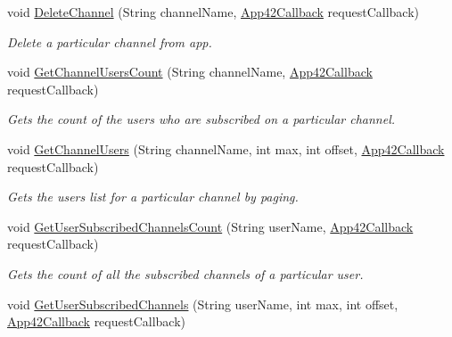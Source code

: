 \begin{DoxyCompactItemize}
void \hyperlink{classcom_1_1shephertz_1_1app42_1_1paas_1_1sdk_1_1windows_1_1push_1_1_push_notification_service_a9b16ea7ff971e6124628552f9e669d44}{Delete\+Channel} (String channel\+Name, \hyperlink{interfacecom_1_1shephertz_1_1app42_1_1paas_1_1sdk_1_1windows_1_1_app42_callback}{App42\+Callback} request\+Callback)
\begin{DoxyCompactList}\small\item\em Delete a particular channel from app. \end{DoxyCompactList}\item 
void \hyperlink{classcom_1_1shephertz_1_1app42_1_1paas_1_1sdk_1_1windows_1_1push_1_1_push_notification_service_a6ecfea7a92869ceef44011fc6bf1a0b9}{Get\+Channel\+Users\+Count} (String channel\+Name, \hyperlink{interfacecom_1_1shephertz_1_1app42_1_1paas_1_1sdk_1_1windows_1_1_app42_callback}{App42\+Callback} request\+Callback)
\begin{DoxyCompactList}\small\item\em Gets the count of the users who are subscribed on a particular channel. \end{DoxyCompactList}\item 
void \hyperlink{classcom_1_1shephertz_1_1app42_1_1paas_1_1sdk_1_1windows_1_1push_1_1_push_notification_service_a5919bb48683c173a8bf8f4ea59bda6e3}{Get\+Channel\+Users} (String channel\+Name, int max, int offset, \hyperlink{interfacecom_1_1shephertz_1_1app42_1_1paas_1_1sdk_1_1windows_1_1_app42_callback}{App42\+Callback} request\+Callback)
\begin{DoxyCompactList}\small\item\em Gets the users list for a particular channel by paging. \end{DoxyCompactList}\item 
void \hyperlink{classcom_1_1shephertz_1_1app42_1_1paas_1_1sdk_1_1windows_1_1push_1_1_push_notification_service_a169a6819d9915225933b2a9493ec19a2}{Get\+User\+Subscribed\+Channels\+Count} (String user\+Name, \hyperlink{interfacecom_1_1shephertz_1_1app42_1_1paas_1_1sdk_1_1windows_1_1_app42_callback}{App42\+Callback} request\+Callback)
\begin{DoxyCompactList}\small\item\em Gets the count of all the subscribed channels of a particular user. \end{DoxyCompactList}\item 
void \hyperlink{classcom_1_1shephertz_1_1app42_1_1paas_1_1sdk_1_1windows_1_1push_1_1_push_notification_service_a4ec490e9504bc65276183f99b6e9ecf3}{Get\+User\+Subscribed\+Channels} (String user\+Name, int max, int offset, \hyperlink{interfacecom_1_1shephertz_1_1app42_1_1paas_1_1sdk_1_1windows_1_1_app42_callback}{App42\+Callback} request\+Callback)

\end{DoxyCompactItemize}
